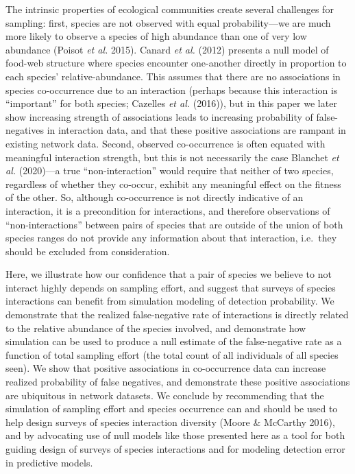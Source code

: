 \documentclass[10pt,oneside]{article}
\begin{document}
The intrinsic properties of ecological communities create several
challenges for sampling: first, species are not observed with equal
probability---we are much more likely to observe a species of high
abundance than one of very low abundance (Poisot \emph{et al.} 2015).
Canard \emph{et al.} (2012) presents a null model of food-web structure
where species encounter one-another directly in proportion to each
species' relative-abundance. This assumes that there are no associations
in species co-occurrence due to an interaction (perhaps because this
interaction is ``important'' for both species; Cazelles \emph{et al.}
(2016)), but in this paper we later show increasing strength of
associations leads to increasing probability of false-negatives in
interaction data, and that these positive associations are rampant in
existing network data. Second, observed co-occurrence is often equated
with meaningful interaction strength, but this is not necessarily the
case Blanchet \emph{et al.} (2020)---a true ``non-interaction'' would
require that neither of two species, regardless of whether they
co-occur, exhibit any meaningful effect on the fitness of the other. So,
although co-occurrence is not directly indicative of an interaction, it
is a precondition for interactions, and therefore observations of
``non-interactions'' between pairs of species that are outside of the
union of both species ranges do not provide any information about that
interaction, i.e.~they should be excluded from consideration.

Here, we illustrate how our confidence that a pair of species we believe
to not interact highly depends on sampling effort, and suggest that
surveys of species interactions can benefit from simulation modeling of
detection probability. We demonstrate that the realized false-negative
rate of interactions is directly related to the relative abundance of
the species involved, and demonstrate how simulation can be used to
produce a null estimate of the false-negative rate as a function of
total sampling effort (the total count of all individuals of all species
seen). We show that positive associations in co-occurrence data can
increase realized probability of false negatives, and demonstrate these
positive associations are ubiquitous in network datasets. We conclude by
recommending that the simulation of sampling effort and species
occurrence can and should be used to help design surveys of species
interaction diversity (Moore \& McCarthy 2016), and by advocating use of
null models like those presented here as a tool for both guiding design
of surveys of species interactions and for modeling detection error in
predictive models.
\end{document}
